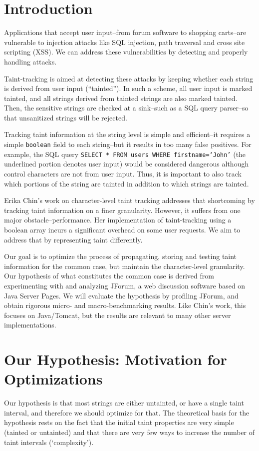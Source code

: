 \documentclass[times,11pt]{article}
\begin{document}
\section{Introduction}
Applications that accept user input--from forum software to shopping carts--are vulnerable to injection attacks like SQL injection, path traversal and cross site scripting (XSS). We can address these vulnerabilities by detecting and properly handling attacks.

Taint-tracking is aimed at detecting these attacks by keeping whether each string is derived from user input (``tainted''). In such a scheme, all user input is marked tainted, and all strings derived from tainted strings are also marked tainted. Then, the sensitive strings are checked at a sink--such as a SQL query parser--so that unsanitized strings will be rejected.

Tracking taint information at the string level is simple and efficient--it requires a simple \verb|boolean| field to each string--but it results in too many false positives. For example, the SQL query \texttt{SELECT * FROM users WHERE firstname=`\underline{John}'} (the underlined portion denotes user input) would be considered dangerous although control characters are not from user input. Thus, it is important to also track which portions of the string are tainted in addition to which strings are tainted.

Erika Chin's work on character-level taint tracking addresses that shortcoming by tracking taint information on a finer granularity. However, it suffers from one major obstacle--performance. Her implementation of taint-tracking using a boolean array incurs a significant overhead on some user requests. We aim to address that by representing taint differently.

Our goal is to optimize the process of propagating, storing and testing taint information for the common case, but maintain the character-level granularity. Our hypothesis of what constitutes the common case is derived from experimenting with and analyzing JForum, a web discussion software based on Java Server Pages. We will evaluate the hypothesis by profiling JForum, and obtain rigorous micro- and macro-benchmarking results. Like Chin's work, this focuses on Java/Tomcat, but the results are relevant to many other server implementations.
\section{Our Hypothesis: Motivation for Optimizations}
Our hypothesis is that most strings are either untainted, or have a single taint interval, and therefore we should optimize for that. The theoretical basis for the hypothesis rests on the fact that the initial taint properties are very simple (tainted or untainted) and that there are very few ways to increase the number of taint intervals (`complexity').
\end{document}
